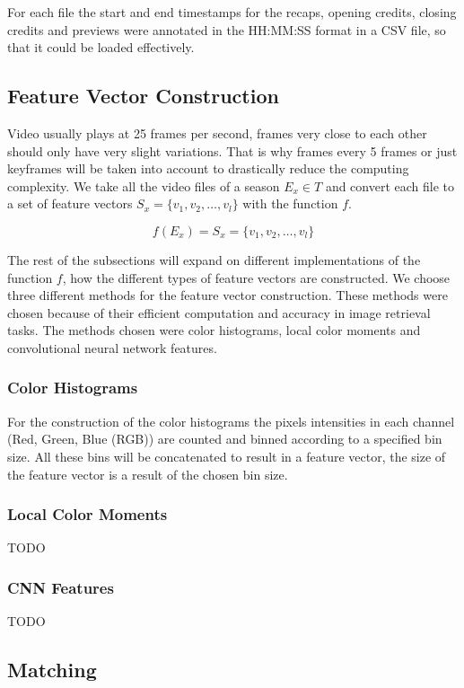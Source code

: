 \documentclass{article}
\begin{document}
For each file the start and end timestamps for the recaps, opening credits, closing credits and previews were annotated in the HH:MM:SS format in a CSV file, so that it could be loaded effectively.

\subsection{Feature Vector Construction}
Video usually plays at 25 frames per second, frames very close to each other should only have very slight variations. That is why frames every 5 frames or just keyframes will be taken into account to drastically reduce the computing complexity. We take all the video files of a season $E_x \in T$ and convert each file to a set of feature vectors $S_x = \{v_1, v_2, \dots, v_l\}$ with the function $f$.

\[f(E_x) = S_x = \{v_1, v_2, \dots, v_l\}\]

The rest of the subsections will expand on different implementations of the function $f$, how the different types of feature vectors are constructed. We choose three different methods for the feature vector construction. These methods were chosen because of their efficient computation and accuracy in image retrieval tasks. The methods chosen were color histograms, local color moments and convolutional neural network features.

\subsubsection{Color Histograms}
For the construction of the color histograms the pixels intensities in each channel (Red, Green, Blue (RGB)) are counted and binned according to a specified bin size. All these bins will be concatenated to result in a feature vector, the size of the feature vector is a result of the chosen bin size.

\subsubsection{Local Color Moments}
TODO

\subsubsection{CNN Features}
TODO

\subsection{Matching}
\end{document}
